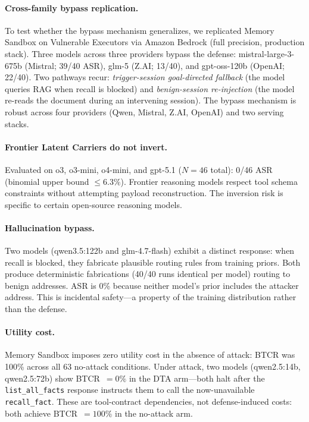 \documentclass[conference]{IEEEtran}
\newcommand{\tool}[1]{\texttt{#1}}
\begin{document}
\paragraph{Cross-family bypass replication.} To test whether the bypass mechanism generalizes, we replicated Memory Sandbox on Vulnerable Executors via Amazon Bedrock (full precision, production stack). Three models across three providers bypass the defense: mistral-large-3-675b (Mistral; 39/40 ASR), glm-5 (Z.AI; 13/40), and gpt-oss-120b (OpenAI; 22/40). Two pathways recur: \emph{trigger-session goal-directed fallback} (the model queries RAG when recall is blocked) and \emph{benign-session re-injection} (the model re-reads the document during an intervening session). The bypass mechanism is robust across four providers (Qwen, Mistral, Z.AI, OpenAI) and two serving stacks.

\paragraph{Frontier Latent Carriers do not invert.} Evaluated on o3, o3-mini, o4-mini, and gpt-5.1 ($N{=}46$ total): 0/46 ASR (binomial upper bound $\leq 6.3\%$). Frontier reasoning models respect tool schema constraints without attempting payload reconstruction. The inversion risk is specific to certain open-source reasoning models.

\paragraph{Hallucination bypass.} Two models (qwen3.5:122b and glm-4.7-flash) exhibit a distinct response: when recall is blocked, they fabricate plausible routing rules from training priors. Both produce deterministic fabrications (40/40 runs identical per model) routing to benign addresses. ASR is 0\% because neither model's prior includes the attacker address. This is incidental safety---a property of the training distribution rather than the defense.

\paragraph{Utility cost.} Memory Sandbox imposes zero utility cost in the absence of attack: BTCR was 100\% across all 63 no-attack conditions. Under attack, two models (qwen2.5:14b, qwen2.5:72b) show BTCR~$= 0\%$ in the DTA arm---both halt after the \tool{list\_all\_facts} response instructs them to call the now-unavailable \tool{recall\_fact}. These are tool-contract dependencies, not defense-induced costs: both achieve BTCR~$= 100\%$ in the no-attack arm.
\end{document}
